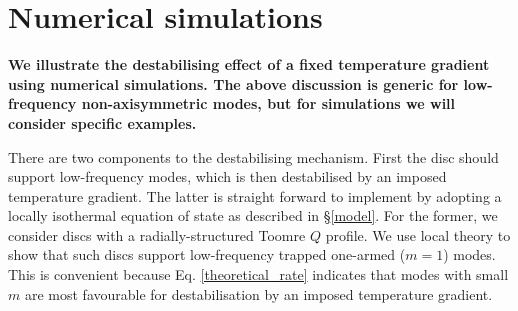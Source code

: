 


\section{Numerical simulations}\label{methods}
{\bf
  We illustrate the destabilising effect of a fixed temperature
  gradient using numerical simulations. The above discussion is
  generic for low-frequency non-axisymmetric modes, but for
  simulations we will consider specific examples.  
  
  There are two components to the destabilising mechanism.  First
  the disc should support low-frequency modes, which is then
  destabilised by an imposed temperature gradient. The latter is
  straight forward to implement by adopting a locally isothermal
  equation of state as described in \S\ref{model}.  For the former, we
  consider discs with a  
  radially-structured Toomre $Q$ profile. We use local theory to show that such discs support
  low-frequency trapped one-armed ($m=1$) modes. 
  This is convenient because Eq. \ref{theoretical_rate} indicates that
  modes with small $m$ are
  most favourable for destabilisation by an imposed temperature
  gradient.  
}


